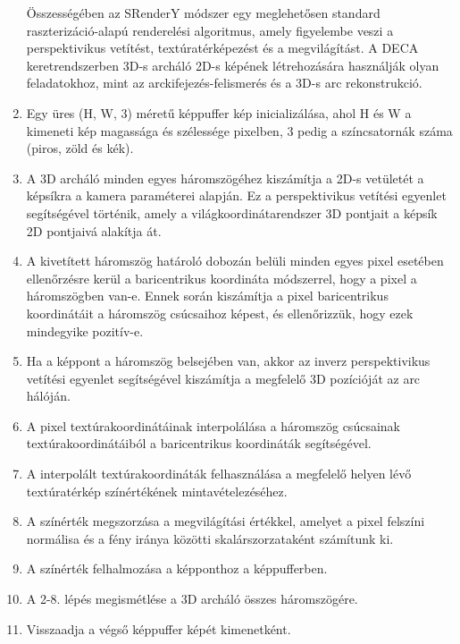 \documentclass[12pt,a4]{article}
\begin{document}
 \begin{enumerate}
 
 Összességében az SRenderY módszer egy meglehetősen standard raszterizáció-alapú renderelési algoritmus, amely figyelembe veszi a perspektivikus vetítést,
textúratérképezést és a megvilágítást. A DECA keretrendszerben 3D-s archáló 2D-s képének létrehozására használják olyan feladatokhoz, mint az arckifejezés-felismerés és a 3D-s arc rekonstrukció.

     \item Egy üres (H, W, 3) méretű képpuffer kép inicializálása, ahol H és W a kimeneti kép magassága és szélessége pixelben, 3 pedig a színcsatornák száma (piros, zöld és kék).

    \item A 3D archáló minden egyes háromszögéhez kiszámítja a 2D-s vetületét a képsíkra a kamera paraméterei alapján. Ez a perspektivikus vetítési egyenlet segítségével történik, 
 amely a világkoordinátarendszer 3D pontjait a képsík 2D pontjaivá alakítja át.

    \item A kivetített háromszög határoló dobozán belüli minden egyes pixel esetében ellenőrzésre kerül a baricentrikus koordináta módszerrel, hogy a pixel a háromszögben van-e. 
Ennek során kiszámítja a pixel baricentrikus koordinátáit a háromszög csúcsaihoz képest, és ellenőrizzük, hogy ezek mindegyike pozitív-e.
 
    \item Ha a képpont a háromszög belsejében van, akkor az inverz perspektivikus vetítési egyenlet segítségével kiszámítja a megfelelő 3D pozícióját az arc hálóján.

    \item A pixel textúrakoordinátáinak interpolálása a háromszög csúcsainak textúrakoordinátáiból a baricentrikus koordináták segítségével.

    \item A interpolált textúrakoordináták felhasználása a megfelelő helyen lévő textúratérkép színértékének mintavételezéséhez.

    \item A színérték megszorzása a megvilágítási értékkel, amelyet a pixel felszíni normálisa és a fény iránya közötti skalárszorzataként számítunk ki.

    \item A színérték felhalmozása a képponthoz a képpufferben.

    \item A 2-8. lépés megismétlése a 3D archáló összes háromszögére.

    \item Visszaadja a végső képpuffer képét kimenetként.
    
 \end{enumerate}
\end{document}
